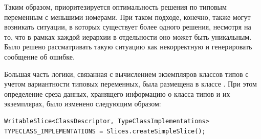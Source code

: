 Таким образом, приоритезируется оптимальность решения по типовым переменным с меньшими номерами. При таком подходе, конечно, также могут возникать ситуации, в которых существует более одного решения, несмотря на то, что в рамках каждой иерархии в отдельности оно может быть уникальным. Было решено рассматривать такую ситуацию как некорректную и генерировать сообщение об ошибке. 

Большая часть логики, связанная с вычислением экземпляров классов типов с учетом вариантности типовых переменных, была размещена в классе . При этом определение среза данных, хранящего информацию о класса типов и их экземплярах, было изменено следующим образом:
\begin{lstlisting}[style={wo_caption}]
WritableSlice<ClassDescriptor, TypeClassImplementations> 
TYPECLASS_IMPLEMENTATIONS = Slices.createSimpleSlice();
\end{lstlisting}